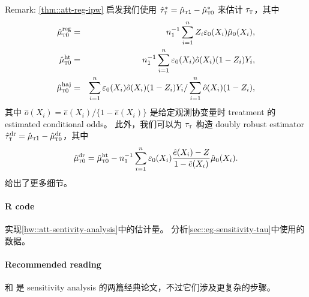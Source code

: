 Remark:  \cref{thm::att-reg-ipw} 启发我们使用 $\hat{\tau}_{\textsc{t}}^* = \hat{\mu}_{\textsc{t}1}  - \hat{\mu}_{\textsc{t}0}^*$ 来估计 $\tau_{\textsc{t}}$，其中
 \begin{eqnarray*}
\hat{\mu}_{\textsc{t}0}^\text{reg} &=& n_1^{-1} \sum_{i=1}^n Z_i  \varepsilon_0(X_i) \hat  \mu_0(X_i) ,   \\
\hat{\mu}_{\textsc{t}0}^\text{ht} &=& n_1^{-1} \sum_{i=1}^n   \varepsilon_0(X_i) \hat  o(X_i) (1-Z_i) Y_i ,   \\
\hat{\mu}_{\textsc{t}0}^\text{haj} &=&  \sum_{i=1}^n   \varepsilon_0(X_i) \hat  o(X_i) (1-Z_i) Y_i  /  \sum_{i=1}^n   \hat  o(X_i) (1-Z_i) , 
\end{eqnarray*}
其中 $  \hat  o(X_i) = \hat  e(X_i) / \{1- \hat  e(X_i)\}$ 是给定观测协变量时 treatment 的 estimated conditional odds。
此外，我们可以为 $\tau_{\textsc{t}}$ 构造 doubly robust estimator
$\hat{\tau}_{\textsc{t}}^\text{dr} = \hat{\mu}_{\textsc{t}1}  - \hat{\mu}_{\textsc{t}0}^\text{dr}$，其中
$$
\hat{\mu}_{\textsc{t}0}^\text{dr} = 
\hat{\mu}_{\textsc{t}0}^\text{ht}  - n_1^{-1} \sum_{i=1}^n \varepsilon_0(X_i) \frac{\hat e(X_i) - Z}{1-\hat e(X_i)}  \hat \mu_0(X_i)  . 
$$
\citet{luding2023flexible} 给出了更多细节。



\paragraph{R code}

实现\cref{hw::att-sentivity-analysis}中的估计量。
分析\cref{sec::eg-sensitivity-tau}中使用的数据。


\paragraph{Recommended reading}

 \citet{Rosenbaum::1983JRSSB} 和 \citet{imbens2003sensitivity} 是 sensitivity analysis 的两篇经典论文，不过它们涉及更复杂的步骤。
